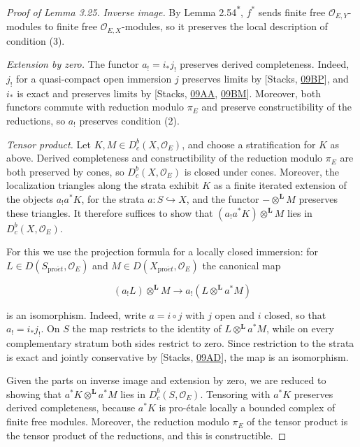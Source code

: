 \documentclass[11pt]{article}
\newcommand{\bpout}[1]{#1\textsuperscript{\hyperlink{bp-outside}{\ensuremath{\ast}}}}
\providecommand{\Dbc}{}\renewcommand{\Dbc}{D^b_c}
\begin{document}
\begin{proof}[{Proof of Lemma 3.25}]
\emph{Inverse image.} By Lemma \bpout{2.54}, \(f^*\) sends finite free \(\mathcal O_{E,Y}\)-modules to finite free \(\mathcal O_{E,X}\)-modules, so it preserves the local description of condition (3).

\emph{Extension by zero.} The functor \(a_!=i_*j_!\) preserves derived completeness. Indeed, \(j_!\) for a quasi-compact open immersion \(j\) preserves limits by [Stacks, \href{https://stacks.math.columbia.edu/tag/09BP}{09BP}], and \(i_*\) is exact and preserves limits by [Stacks, \href{https://stacks.math.columbia.edu/tag/09AA}{09AA}, \href{https://stacks.math.columbia.edu/tag/09BM}{09BM}]. Moreover, both functors commute with reduction modulo \(\pi_E\) and preserve constructibility of the reductions, so \(a_!\) preserves condition (2).

\emph{Tensor product.} Let \(K,M\in\Dbc(X,\mathcal O_E)\), and choose a stratification for \(K\) as above. Derived completeness and constructibility of the reduction modulo \(\pi_E\) are both preserved by cones, so \(\Dbc(X,\mathcal O_E)\) is closed under cones. Moreover, the localization triangles along the strata exhibit \(K\) as a finite iterated extension of the objects \(a_!a^*K\), for the strata \(a:S\hookrightarrow X\), and the functor \(-\otimes^{\mathbf L}M\) preserves these triangles. It therefore suffices to show that \((a_!a^*K)\otimes^{\mathbf L}M\) lies in \(\Dbc(X,\mathcal O_E)\).

For this we use the projection formula for a locally closed immersion: for \(L\in D(S_{\mathrm{pro}\acute{e}t},\mathcal O_E)\) and \(M\in D(X_{\mathrm{pro}\acute{e}t},\mathcal O_E)\) the canonical map

\[
(a_!L)\otimes^{\mathbf L}M\longrightarrow a_!(L\otimes^{\mathbf L}a^*M)
\]

is an isomorphism. Indeed, write \(a=i\circ j\) with \(j\) open and \(i\) closed, so that \(a_!=i_*j_!\). On \(S\) the map restricts to the identity of \(L\otimes^{\mathbf L}a^*M\), while on every complementary stratum both sides restrict to zero. Since restriction to the strata is exact and jointly conservative by [Stacks, \href{https://stacks.math.columbia.edu/tag/09AD}{09AD}], the map is an isomorphism.

Given the parts on inverse image and extension by zero, we are reduced to showing that \(a^*K\otimes^{\mathbf L}a^*M\) lies in \(\Dbc(S,\mathcal O_E)\). Tensoring with \(a^*K\) preserves derived completeness, because \(a^*K\) is pro-étale locally a bounded complex of finite free modules. Moreover, the reduction modulo \(\pi_E\) of the tensor product is the tensor product of the reductions, and this is constructible.


\end{proof}
\end{document}
